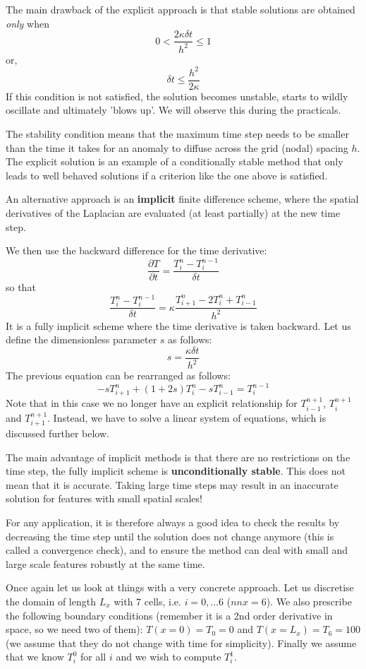 The main drawback of the explicit approach is that stable solutions are
obtained {\it only} when
\[
0 < \frac{2\kappa \delta t}{h^2} \leq1
\]
or,
\[
\delta t \leq \frac{h^2}{2 \kappa}
\]
If this condition is not satisfied, the solution becomes {\color{olive} unstable}, starts to
wildly oscillate and ultimately 'blows up'. We will observe this during the practicals. 

The stability condition means that the maximum time step needs to be smaller than the time it
takes for an anomaly to diffuse across the grid (nodal) spacing $h$.
The explicit solution is an example of a {\color{olive} conditionally stable method}
that only leads to well behaved solutions if a criterion like the one above is satisfied.

An alternative approach is an {\bf implicit} finite difference scheme, where the spatial derivatives
of the Laplacian are evaluated (at least partially) at the new time step.

We then use the backward difference for the time derivative:
\[
\frac{\partial T}{\partial t} 
= \frac{T_{i}^{n}-T_i^{n-1}}{\delta t} 
\]
so that
\[
\frac{T_{i}^{n}-T_i^{n-1}}{\delta t} 
= \kappa \frac{T_{i+1}^n - 2T_i^n + T_{i-1}^n}{h^2}
\]
It is a fully implicit scheme where the time derivative is taken backward.
Let us define the dimensionless parameter $s$ as follows:
\[
s=\frac{\kappa \delta t}{h^2}
\]
The previous equation can be rearranged as follows:
\[
-s T_{i+1}^{n} + (1+2s) T_{i}^{n} - s T_{i-1}^{n} = T_i^{n-1}
\]
Note that in this case we no longer have an explicit relationship for 
$T^{n+1}_{i-1}$, $T^{n+1}_i$ and $T^{n+1}_{i+1}$.
Instead, we have to solve a {\color{olive}linear system of equations}, which is discussed further below.

The main advantage of implicit methods is that there are no restrictions on the time step,
the fully implicit scheme is {\bf unconditionally stable}.
This does not mean that it is accurate. 
Taking large time steps may result in an inaccurate solution for features with
small spatial scales!

For any application, it is therefore always a good idea to check the 
results by decreasing the time step
until the solution does not change anymore (this is called a {\color{olive}convergence check}), and 
to ensure the
method can deal with small and large scale features robustly at the same time.

Once again let us look at things with a very concrete approach. Let us discretise the 
domain of length $L_x$ with 7 cells, i.e. $i=0,\dots 6$ ($nnx=6$).
We also prescribe the following boundary conditions (remember it is a 2nd order derivative in space, 
so we need two of them): $T(x=0)=T_0=0$ and $T(x=L_x)=T_6=100$ (we assume that they 
do not change with time for simplicity). Finally we assume that we 
know $T_i^0$ for all $i$ and we wish to compute $T_i^1$.

